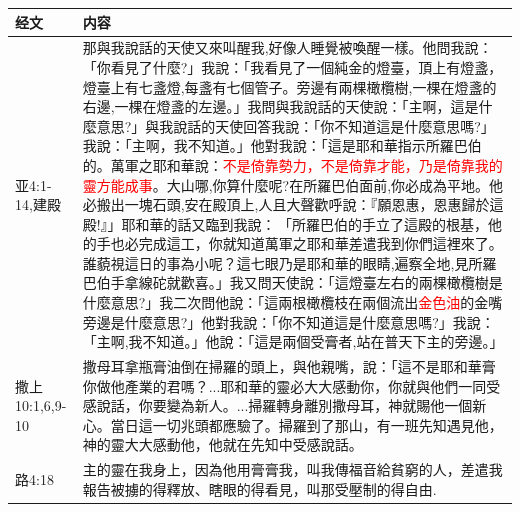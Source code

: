 \begin{table}[H]
\centering
\begin{tabular}{p{4em}|p{44em}}  \toprule
经文&内容\\  \midrule
亚4:1-14,建殿&那與我說話的天使又來叫醒我,好像人睡覺被喚醒一樣。他問我說：「你看見了什麼?」我說：「我看見了一個純金的燈臺，頂上有燈盞，燈臺上有七盞燈,每盞有七個管子。旁邊有兩棵橄欖樹,一棵在燈盞的右邊,一棵在燈盞的左邊。」我問與我說話的天使說：「主啊，這是什麼意思?」與我說話的天使回答我說：「你不知道這是什麼意思嗎?」我說：「主啊，我不知道。」他對我說：「這是耶和華指示所羅巴伯的。萬軍之耶和華說：\textcolor{red}{不是倚靠勢力，不是倚靠才能，乃是倚靠我的靈方能成事}。大山哪,你算什麼呢?在所羅巴伯面前,你必成為平地。他必搬出一塊石頭,安在殿頂上,人且大聲歡呼說：『願恩惠，恩惠歸於這殿!』」耶和華的話又臨到我說： 「所羅巴伯的手立了這殿的根基，他的手也必完成這工，你就知道萬軍之耶和華差遣我到你們這裡來了。誰藐視這日的事為小呢？這七眼乃是耶和華的眼睛,遍察全地,見所羅巴伯手拿線砣就歡喜。」我又問天使說：「這燈臺左右的兩棵橄欖樹是什麼意思?」我二次問他說：「這兩根橄欖枝在兩個流出\textcolor{red}{金色油}的金嘴旁邊是什麼意思?」他對我說：「你不知道這是什麼意思嗎?」我說：「主啊,我不知道。」他說：「這是兩個受膏者,站在普天下主的旁邊。」\\  \midrule 
撒上10:1,6,9-10&撒母耳拿瓶膏油倒在掃羅的頭上，與他親嘴，說：「這不是耶和華膏你做他產業的君嗎？...耶和華的靈必大大感動你，你就與他們一同受感說話，你要變為新人。...掃羅轉身離別撒母耳，神就賜他一個新心。當日這一切兆頭都應驗了。掃羅到了那山，有一班先知遇見他，神的靈大大感動他，他就在先知中受感說話。\\  \midrule
路4:18&主的靈在我身上，因為他用膏膏我，叫我傳福音給貧窮的人，差遣我報告被擄的得釋放、瞎眼的得看見，叫那受壓制的得自由.\\  \midrule
\end{tabular}
\end{table}




